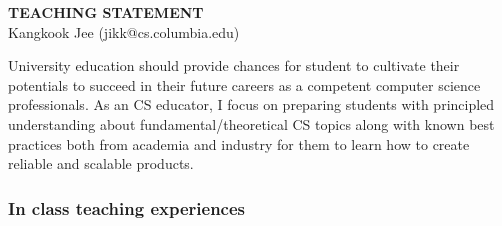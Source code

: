 \documentclass[letterpaper, 10pt]{article}
\begin{document}
\thispagestyle{fancy}

\lhead{}
\rhead{}

\renewcommand{\headrulewidth}{0pt} 
\renewcommand{\footrulewidth}{0pt} 

\fancyfoot[C]{\footnotesize
\textcolor{gray}{http://www.cs.columbia.edu/$\sim$jikk/application}} 

\pagestyle{fancy}
\lhead{\textcolor{gray}{\it Kangkook Jee}}
\rhead{\textcolor{gray}{\thepage /\pageref{LastPage}}}

\begin{small}

\begin{center} {\LARGE \bf TEACHING STATEMENT}\\ \vspace*{0.1cm} {\normalsize
Kangkook Jee (jikk@cs.columbia.edu)} \end{center}
University education should provide chances for student to cultivate their
potentials to succeed in their future careers as a competent computer science
professionals.  
%
As an CS educator, I focus on preparing students with principled understanding
about fundamental/theoretical CS topics along with known best practices both
from academia and industry for them to learn how to create reliable and
scalable products.


\subsubsection*{In class teaching experiences}


\end{small}
\end{document}
